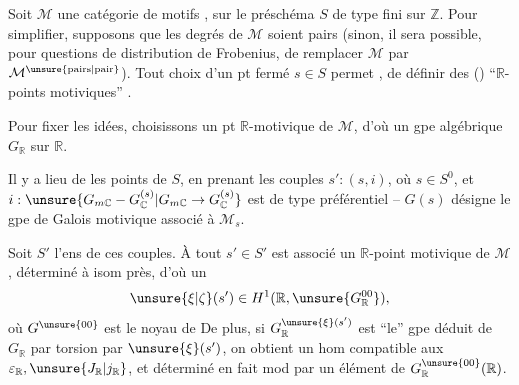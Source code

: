 
Soit $\mathcal M$ une catégorie de motifs ,  sur le préschéma $S$ de type fini sur $\mathbb Z$. Pour simplifier, supposons que les degrés de $\mathcal M$ soient pairs (sinon, il sera possible, pour   questions de distribution de Frobenius, de remplacer $\mathcal M$ par $\mathcal M^{\unsure{\mathrm{pairs}|\mathrm{pair}}}$). Tout choix d'un pt fermé $s\in S$ permet , de définir des () ``$\mathbb R$-points motiviques'' .

Pour fixer les idées, choisissons un pt $\mathbb R$-motivique de $\mathcal M$, d'où un gpe algébrique $G_{\mathbb R}$ sur $\mathbb R$.

Il y a lieu de   les points  de $S$, en prenant les couples $s':(s,i)$, où $s\in S^0$, et
$i:\unsure{G_{m\mathbb C}-G^{(s)}_{\mathbb C}|G_{m\mathbb C}\to G^{(s)}_{\mathbb C}}$ est de type  préférentiel -- $G(s)$ désigne le gpe de Galois motivique associé à $\mathcal M_s$.

 Soit $S'$ l'ens de ces couples. À tout $s'\in S'$ est associé un $\mathbb R$-point motivique de $\mathcal M$,  déterminé à isom près, d'où un
\[
\unsure{\xi|\zeta}(s')\in H^1(\mathbb R,\unsure{G^{00}_{\mathbb R}}),
\]
où $G^{\unsure{00}}$ est le noyau de
De plus, si $G^{\unsure{\xi}(s')}_{\mathbb R}$ est ``le'' gpe déduit de $G_{\mathbb R}$ par torsion par $\unsure{\xi}(s')$, on obtient un hom
\diagram{\[
\begin{tikzcd}[column sep=large]
u(s'):\ G(s')_{\deleted{\unsure{\mathbb R}}\mathbb R}=G(s)_{\mathbb R} \arrow[r] & G^{\unsure{\xi}(s')}_{\mathbb R}
\end{tikzcd}
\]}
compatible aux $\varepsilon_{\mathbb R},\unsure{J_{\mathbb R}|j_{\mathbb R}}$, et déterminé en fait mod   par un élément de $G^{\unsure{00}}_{\mathbb R}(\mathbb R)$.

